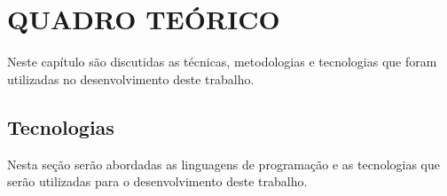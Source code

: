 \chapter{QUADRO TEÓRICO}

\par Neste capítulo são discutidas as técnicas, metodologias e tecnologias que foram utilizadas no desenvolvimento deste trabalho.






\section{Tecnologias}

\par Nesta seção serão abordadas as linguagens de programação e as tecnologias que serão utilizadas para o desenvolvimento deste trabalho.



%





















